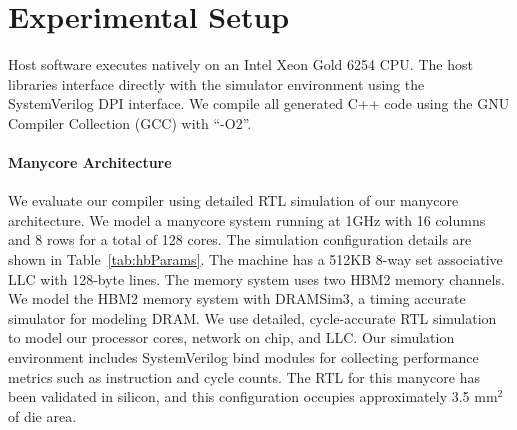 %




\section{Experimental Setup}
Host software executes natively on an Intel Xeon Gold 6254 CPU.
The host libraries interface directly with the simulator environment using the SystemVerilog DPI interface.
We compile all generated C++ code using the GNU Compiler Collection (GCC) with ``-O2''.
\tabHBParams
\paragraph{Manycore Architecture}
\evalGraphsTab

We evaluate our compiler using detailed RTL simulation of our manycore architecture.
We model a manycore system running at 1GHz with 16 columns and 8 rows for a total of 128 cores.
The simulation configuration details are shown in Table~\ref{tab:hbParams}.
The machine has a 512KB 8-way set associative LLC with 128-byte lines.
The memory system uses two HBM2 memory channels.
We model the HBM2 memory system with DRAMSim3\cite{li2019dramsim3},  a timing accurate simulator for modeling DRAM.
We use detailed, cycle-accurate RTL simulation to model our processor cores, network on chip, and LLC.
Our simulation environment includes SystemVerilog bind modules for collecting performance metrics such as instruction and cycle counts.
The RTL for this manycore has been validated in silicon, and this configuration occupies approximately 3.5 mm$^2$ of die area. 


